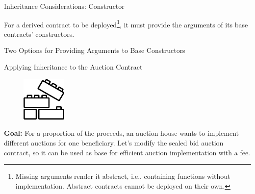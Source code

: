 \documentclass[]{beamer}
\begin{document}
\begin{frame}{Inheritance Considerations: Constructor}

For a derived contract to be deployed\footnote{Missing arguments render it abstract, i.e., containing functions without implementation. Abstract contracts cannot be deployed on their own.}, it must provide the arguments of its base contracts' constructors.

\vspace{-0.5em}

\begin{samplecode}{Two Options for Providing Arguments to Base Constructors}
	
\end{samplecode}


\end{frame}


\begin{frame}{Applying Inheritance to the Auction Contract}

\begin{minipage}{0.3\textwidth}
	\begin{figure}
		\center
		\includegraphics[width= 2.2cm]{../assets/images/construction.png}	
	\end{figure}
\end{minipage}
\begin{minipage}{0.65\textwidth}
	\textbf{Goal:} For a proportion of the proceeds, an auction house wants to implement different auctions for one beneficiary. Let's modify the sealed bid auction contract, so it can be used as base for efficient auction implementation with a fee.\\
\end{minipage}

\vspace{3em}


\end{frame}
\end{document}
